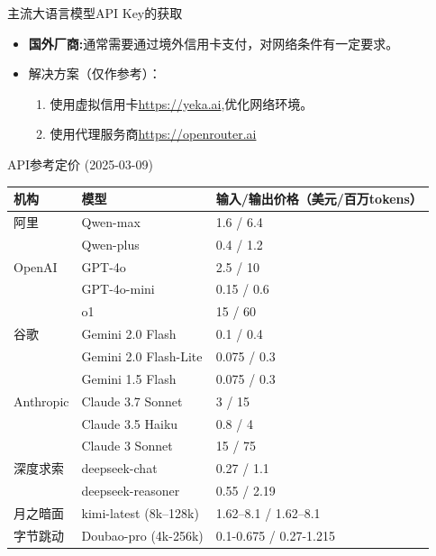 \documentclass{beamer}
\begin{document}
\begin{frame}{主流大语言模型API Key的获取}
	\begin{itemize}
		\item  \textbf{国外厂商:}通常需要通过境外信用卡支付，对网络条件有一定要求。
		\item[] 解决方案（仅作参考）：
		\begin{enumerate}
			\item 使用虚拟信用卡\url{https://yeka.ai},优化网络环境。
			\item 使用代理服务商\url{https://openrouter.ai}
		\end{enumerate}
	\end{itemize}
\end{frame}

\begin{frame}{API参考定价 (2025-03-09)}
    \scriptsize
    \begin{table}[htbp]
        \centering
        \begin{tabular}{lll}
        \hline
        \textbf{机构} & \textbf{模型} & \textbf{输入/输出价格（美元/百万tokens）} \\
        \hline
        阿里 & Qwen-max & 1.6 / 6.4 \\
             & Qwen-plus & 0.4 / 1.2 \\
        \hline
        OpenAI & GPT-4o & 2.5 / 10 \\
               & GPT-4o-mini & 0.15 / 0.6 \\
               & o1 & 15 / 60 \\
        \hline
        谷歌 & Gemini 2.0 Flash & 0.1 / 0.4 \\
             & Gemini 2.0 Flash-Lite & 0.075 / 0.3 \\
             & Gemini 1.5 Flash & 0.075 / 0.3 \\
        \hline
        Anthropic & Claude 3.7 Sonnet & 3 / 15 \\
                  & Claude 3.5 Haiku & 0.8 / 4 \\
                  & Claude 3 Sonnet & 15 / 75 \\
        \hline
        深度求索 & deepseek-chat & 0.27 / 1.1 \\
                & deepseek-reasoner & 0.55 / 2.19 \\
        \hline
        月之暗面 & kimi-latest (8k–128k) & 1.62–8.1 / 1.62–8.1 \\
        \hline
        字节跳动 & Doubao-pro (4k-256k) & 0.1-0.675 / 0.27-1.215 \\

\end{tabular}
\end{table}
\end{frame}
\end{document}
